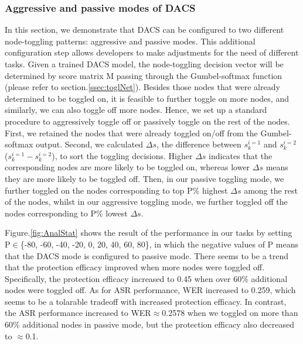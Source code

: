 \documentclass[lettersize,journal]{IEEEtran}
\begin{document}
\subsubsection{Aggressive and passive modes of DACS}
In this section, we demonstrate that DACS can be configured to two different node-toggling patterns: aggressive and passive modes. This additional configuration step allows developers to make adjustments for the need of different tasks. Given a trained DACS model, the node-toggling decision vector will be determined by score matrix M passing through the Gumbel-softmax function (please refer to section.\ref{ssec:toglNet}). Besides those nodes that were already determined to be toggled on, it is feasible to further toggle on more nodes, and similarly, we can also toggle off more nodes. Hence, we set up a standard procedure to aggressively toggle off or passively toggle on the rest of the nodes. First, we retained the nodes that were already toggled on/off from the Gumbel-softmax output. Second, we calculated $\Delta s$, the difference between $s^{i=1}_{k}$ and $s^{i=2}_{k}$ ($s^{i=1}_{k} - s^{i=2}_{k}$), to sort the toggling decisions. Higher $\Delta s$ indicates that the corresponding nodes are more likely to be toggled on, whereas lower $\Delta s$ means they are more likely to be toggled off. Then, in our passive toggling mode, we further toggled on the nodes corresponding to top P\% highest $\Delta s$ among the rest of the nodes, whilst in our aggressive toggling mode, we further toggled off the nodes corresponding to P\% lowest $\Delta s$.

Figure.\ref{fig:AnalStat} shows the result of the performance in our tasks by setting P$\in$\{-80, -60, -40, -20, 0, 20, 40, 60, 80\}, in which the negative values of P means that the DACS mode is configured to passive mode. There seems to be a trend that the protection efficacy improved when more nodes were toggled off. Specifically, the protection efficacy increased to 0.45 when over 60\% additional nodes were toggled off. As for ASR performance, WER increased to 0.259, which seems to be a tolarable tradeoff with increased protection efficacy. In contrast, the ASR performance increased to WER$\approx$0.2578 when we toggled on more than 60\% additional nodes in passive mode, but the protection efficacy also decreased to $\approx$0.1. 
\end{document}

